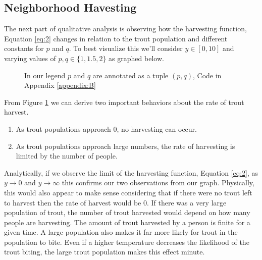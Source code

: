 \documentclass[letterpaper,12pt]{article}
\begin{document}
\subsection{Neighborhood Havesting}
The next part of qualitative analysis is observing how the harvesting function, Equation \eqref{eq:2} changes in relation to the trout population and different constants for \(p\) and \(q\).
To best visualize this we'll consider \(y \in [0,10]\) and varying values of \(p,q \in \{1, 1.5, 2\}\) as graphed below.
\newline
\begin{figure}[H]
    \centering
    
    \caption{In our legend \(p\) and \(q\) are annotated as a tuple \((p,q)\), Code in Appendix \ref{appendix:B}}
    \label{fig:2}
\end{figure}
From Figure \ref{fig:2} we can derive two important behaviors about the rate of trout harvest.
\begin{enumerate}
    \item As trout populations approach 0, no harvesting can occur.
    \item As trout populations approach large numbers, the rate of harvesting is limited by the number of people.
\end{enumerate}
Analytically, if we observe the limit of the harvesting function, Equation \eqref{eq:2}, as \(y\to 0\) and \(y\to \infty\) this confirms our two observations from our graph. 
Physically, this would also appear to make sense considering that if there were no trout left to harvest then the rate of harvest would be 0. 
If there was a very large population of trout, the number of trout harvested would depend on how many people are harvesting. The amount of trout harvested by a person is finite for a given time. 
A large population also makes it far more likely for trout in the population to bite. Even if a higher temperature decreases the likelihood of the trout biting, the large trout population makes this effect minute.
\end{document}

